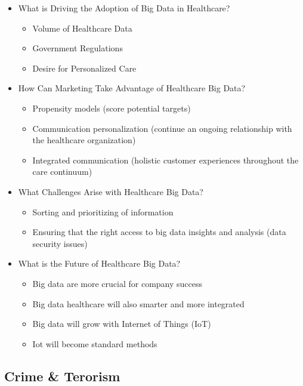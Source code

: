 \documentclass[]{book}
\providecommand{\tightlist}{%
  \setlength{\itemsep}{0pt}\setlength{\parskip}{0pt}}
\begin{document}
\begin{itemize}
\tightlist
\item
  What is Driving the Adoption of Big Data in Healthcare?

  \begin{itemize}
  \tightlist
  \item
    Volume of Healthcare Data
  \item
    Government Regulations
  \item
    Desire for Personalized Care
  \end{itemize}
\item
  How Can Marketing Take Advantage of Healthcare Big Data?

  \begin{itemize}
  \tightlist
  \item
    Propensity models (score potential targets)
  \item
    Communication personalization (continue an ongoing relationship with
    the healthcare organization)
  \item
    Integrated communication (holistic customer experiences throughout
    the care continuum)
  \end{itemize}
\item
  What Challenges Arise with Healthcare Big Data?

  \begin{itemize}
  \tightlist
  \item
    Sorting and prioritizing of information
  \item
    Ensuring that the right access to big data insights and analysis
    (data security issues)
  \end{itemize}
\item
  What is the Future of Healthcare Big Data?

  \begin{itemize}
  \tightlist
  \item
    Big data are more crucial for company success
  \item
    Big data healthcare will also smarter and more integrated
  \item
    Big data will grow with Internet of Things (IoT)
  \item
    Iot will become standard methods
  \end{itemize}
\end{itemize}

\subsection{Crime \& Terorism}\label{crime-terorism}
\end{document}
